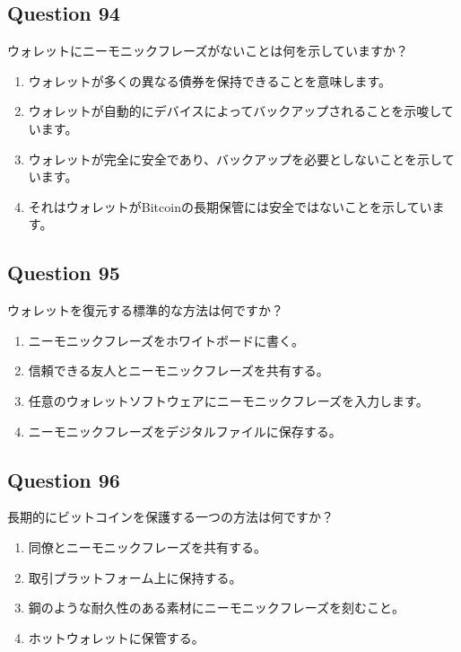 \documentclass[12pt,a4paper]{article}
\begin{document}
\subsection*{Question 94}
ウォレットにニーモニックフレーズがないことは何を示していますか？

\begin{enumerate}[label=\Alph*., leftmargin=*]
\item ウォレットが多くの異なる債券を保持できることを意味します。
\item ウォレットが自動的にデバイスによってバックアップされることを示唆しています。
\item ウォレットが完全に安全であり、バックアップを必要としないことを示しています。
\item それはウォレットがBitcoinの長期保管には安全ではないことを示しています。
\end{enumerate}

\bigskip


\subsection*{Question 95}
ウォレットを復元する標準的な方法は何ですか？

\begin{enumerate}[label=\Alph*., leftmargin=*]
\item ニーモニックフレーズをホワイトボードに書く。
\item 信頼できる友人とニーモニックフレーズを共有する。
\item 任意のウォレットソフトウェアにニーモニックフレーズを入力します。
\item ニーモニックフレーズをデジタルファイルに保存する。
\end{enumerate}

\bigskip


\subsection*{Question 96}
長期的にビットコインを保護する一つの方法は何ですか？

\begin{enumerate}[label=\Alph*., leftmargin=*]
\item 同僚とニーモニックフレーズを共有する。
\item 取引プラットフォーム上に保持する。
\item 鋼のような耐久性のある素材にニーモニックフレーズを刻むこと。
\item ホットウォレットに保管する。
\end{enumerate}
\end{document}

